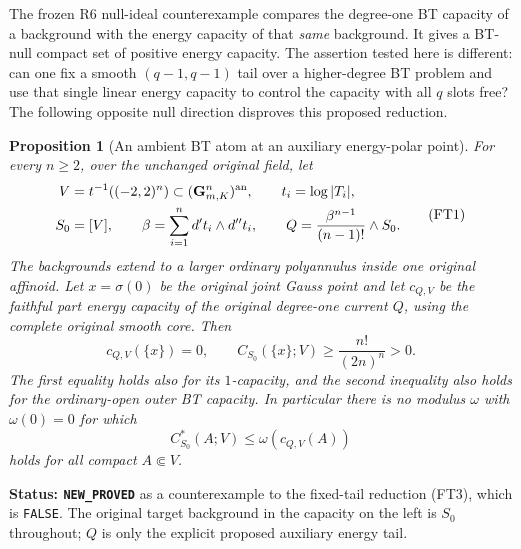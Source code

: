 \documentclass[11pt,a4paper]{article}
\numberwithin{equation}{section}
\newtheorem{proposition}[theorem]{Proposition}
\theoremstyle{definition}
\theoremstyle{remark}
\begin{document}
The frozen R6 null-ideal counterexample compares the degree-one
BT capacity of a background with the energy capacity of that
\emph{same} background. It gives a BT-null compact set of
positive energy capacity. The assertion tested here is different:
can one fix a smooth $(q-1,q-1)$ tail over a higher-degree
BT problem and use that single linear energy capacity to control
the capacity with all $q$ slots free? The following opposite
null direction disproves this proposed reduction.

\begin{proposition}[An ambient BT atom at an auxiliary energy-polar point]
\label{prop:r11-fixed-tail-energy-obstruction}
For every $n\geq2$, over the unchanged original field, let
\[
 \begin{split}
 V&=t^{-1}((-2,2)^n)\subset(\mathbf G_{m,K}^n)^{\rm an},
       \qquad t_i=\log|T_i|,\\
 S_0&=[V],\qquad
 \beta=\sum_{i=1}^n d't_i\wedge d''t_i,\qquad
 Q=\frac{\beta^{n-1}}{(n-1)!}\wedge S_0.
 \end{split}
 \tag{FT1}
\]
The backgrounds extend to a larger ordinary polyannulus inside
one original affinoid. Let $x=\sigma(0)$ be the original joint
Gauss point and let $c_{Q,V}$ be the faithful part energy capacity
of the original degree-one current $Q$, using the complete
original smooth core. Then
\[
             c_{Q,V}(\{x\})=0,
             \qquad
             C_{S_0}(\{x\};V)
                      \geq\frac{n!}{(2n)^n}>0.
 \tag{FT2}
\]
The first equality holds also for its $1$-capacity, and the
second inequality also holds for the ordinary-open outer BT
capacity. In particular there is no modulus $\omega$ with
$\omega(0)=0$ for which
\[
                  C_{S_0}^*(A;V)\leq\omega(c_{Q,V}(A))
 \tag{FT3}
\]
holds for all compact $A\Subset V$.
\end{proposition}

\noindent\textbf{Status: \texttt{NEW\_PROVED}} as a
counterexample to the fixed-tail reduction (FT3), which is
\texttt{FALSE}. The original target background in the
capacity on the left is $S_0$ throughout; $Q$ is only the
explicit proposed auxiliary energy tail.
\end{document}
